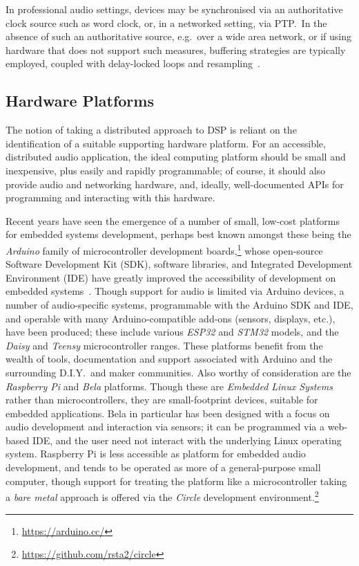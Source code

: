 \documentclass[utf8]{FrontiersinHarvard}
\begin{document}
    In professional audio settings, devices may be synchronised via an
    authoritative clock source such as word clock, or, in a networked setting,
    via PTP.\
    In the absence of such an authoritative source, e.g.\ over a wide area
    network, or if using hardware that does not support such measures, buffering
    strategies are typically employed, coupled with delay-locked loops and
    resampling~\citep{adriaensen_using_2005, adriaensen_controlling_2012}.

    \subsection{Hardware Platforms}\label{subsec:hardware-platforms}

    The notion of taking a distributed approach to DSP is reliant on the
    identification of a suitable supporting hardware platform.
    For an accessible, distributed audio application, the ideal computing platform
    should be small and inexpensive, plus easily and rapidly programmable;
    of course, it should also provide audio and networking hardware, and, ideally,
    well-documented APIs for programming and interacting with this hardware.

    Recent years have seen the emergence of a number of small, low-cost
    platforms for embedded systems development, perhaps best known amongst these
    being the \textit{Arduino} family of microcontroller development
    boards,\footnote{
        \url{https://arduino.cc/}
    } whose open-source Software Development Kit
    (SDK), software libraries, and Integrated Development Environment (IDE) have
    greatly improved the accessibility of development on embedded
    systems~\citep{michon_embedded_2020}.
    Though support for audio is limited via Arduino devices, a number of
    audio-specific systems, programmable with the Arduino SDK and IDE, and
    operable with many Arduino-compatible add-ons (sensors, displays, etc.),
    have been produced;
    these include various \textit{ESP32} and \textit{STM32} models, and the
    \textit{Daisy} and \textit{Teensy} microcontroller ranges.
    These platforms benefit from the wealth of tools, documentation and support
    associated with Arduino and the surrounding D.I.Y.\ and maker communities.
    Also worthy of consideration are the \textit{Raspberry Pi} and \textit{Bela}
    platforms.
    Though these are \textit{Embedded Linux Systems} rather than
    microcontrollers, they are small-footprint devices, suitable for embedded
    applications.
    Bela in particular has been designed with a focus on audio development and
    interaction via sensors; it can be programmed via a web-based IDE, and the
    user need not interact with the underlying Linux operating system.
    Raspberry Pi is less accessible as platform for embedded audio development,
    and tends to be operated as more of a general-purpose small computer, though
    support for treating the platform like a microcontroller \textemdash{}
    taking a \textit{bare metal} approach \textemdash{} is offered via the
    \textit{Circle} development environment.\footnote{\url{https://github.com/rsta2/circle}}
\end{document}
